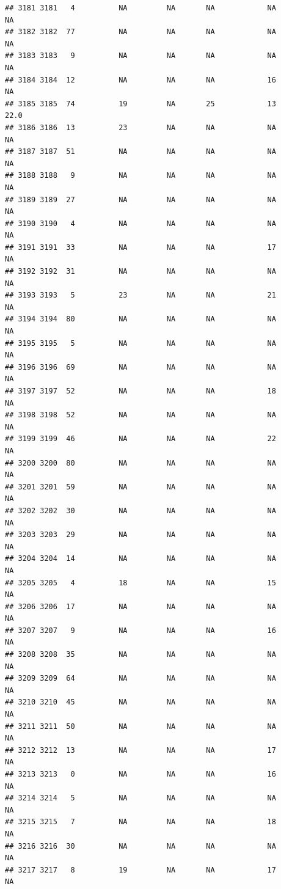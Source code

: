 \documentclass[man]{apa6}
\begin{document}
\begin{verbatim}
## 3181 3181   4          NA         NA       NA            NA       NA
## 3182 3182  77          NA         NA       NA            NA       NA
## 3183 3183   9          NA         NA       NA            NA       NA
## 3184 3184  12          NA         NA       NA            16       NA
## 3185 3185  74          19         NA       25            13     22.0
## 3186 3186  13          23         NA       NA            NA       NA
## 3187 3187  51          NA         NA       NA            NA       NA
## 3188 3188   9          NA         NA       NA            NA       NA
## 3189 3189  27          NA         NA       NA            NA       NA
## 3190 3190   4          NA         NA       NA            NA       NA
## 3191 3191  33          NA         NA       NA            17       NA
## 3192 3192  31          NA         NA       NA            NA       NA
## 3193 3193   5          23         NA       NA            21       NA
## 3194 3194  80          NA         NA       NA            NA       NA
## 3195 3195   5          NA         NA       NA            NA       NA
## 3196 3196  69          NA         NA       NA            NA       NA
## 3197 3197  52          NA         NA       NA            18       NA
## 3198 3198  52          NA         NA       NA            NA       NA
## 3199 3199  46          NA         NA       NA            22       NA
## 3200 3200  80          NA         NA       NA            NA       NA
## 3201 3201  59          NA         NA       NA            NA       NA
## 3202 3202  30          NA         NA       NA            NA       NA
## 3203 3203  29          NA         NA       NA            NA       NA
## 3204 3204  14          NA         NA       NA            NA       NA
## 3205 3205   4          18         NA       NA            15       NA
## 3206 3206  17          NA         NA       NA            NA       NA
## 3207 3207   9          NA         NA       NA            16       NA
## 3208 3208  35          NA         NA       NA            NA       NA
## 3209 3209  64          NA         NA       NA            NA       NA
## 3210 3210  45          NA         NA       NA            NA       NA
## 3211 3211  50          NA         NA       NA            NA       NA
## 3212 3212  13          NA         NA       NA            17       NA
## 3213 3213   0          NA         NA       NA            16       NA
## 3214 3214   5          NA         NA       NA            NA       NA
## 3215 3215   7          NA         NA       NA            18       NA
## 3216 3216  30          NA         NA       NA            NA       NA
## 3217 3217   8          19         NA       NA            17       NA

\end{verbatim}
\end{document}
